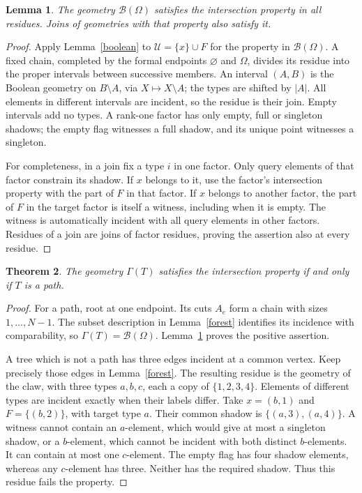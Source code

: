 \documentclass[11pt,a4paper]{article}
\newtheorem{theorem}{Theorem}
\newtheorem{lemma}[theorem]{Lemma}
\begin{document}
\begin{lemma}\label{boolean-residues}
The geometry $\mathcal B(\Omega)$ satisfies the intersection property
in all residues. Joins of geometries with that property also satisfy it.
\end{lemma}
\begin{proof}
Apply Lemma~\ref{boolean} to $\mathcal U=\{x\}\cup F$ for the property
in $\mathcal B(\Omega)$. A fixed chain, completed by the formal endpoints
$\varnothing$ and $\Omega$, divides its residue into the proper intervals
between successive members. An interval $(A,B)$ is the Boolean geometry
on $B\setminus A$, via $X\mapsto X\setminus A$; the types are shifted
by $|A|$. All elements in different intervals are incident, so the residue
is their join. Empty intervals add no types. A rank-one factor has only
empty, full or singleton shadows; the empty flag witnesses a full
shadow, and its unique point witnesses a singleton.

For completeness, in a join fix a type $i$ in one factor. Only query
elements of that factor constrain its shadow. If $x$ belongs to it, use
the factor's intersection property with the part of $F$ in that factor.
If $x$ belongs to another factor, the part of $F$ in the target factor
is itself a witness, including when it is empty. The witness is
automatically incident with all query elements in other factors.
Residues of a join are joins of factor residues, proving the assertion
also at every residue.
\end{proof}

\begin{theorem}\label{path}
The geometry $\Gamma(T)$ satisfies the intersection property if and only
if $T$ is a path.
\end{theorem}
\begin{proof}
For a path, root at one endpoint. Its cuts $A_e$ form a chain with sizes
$1,\ldots,N-1$. The subset description in Lemma~\ref{forest} identifies
its incidence with comparability, so $\Gamma(T)=\mathcal B(\Omega)$.
Lemma~\ref{boolean-residues} proves the positive assertion.

A tree which is not a path has three edges incident at a common vertex.
Keep precisely those edges in Lemma~\ref{forest}. The resulting residue
is the geometry of the claw, with three types $a,b,c$, each a copy of
$\{1,2,3,4\}$. Elements of different types are incident exactly when
their labels differ. Take $x=(b,1)$ and $F=\{(b,2)\}$, with target
type $a$. Their common shadow is $\{(a,3),(a,4)\}$. A witness cannot
contain an $a$-element, which would give at most a singleton shadow,
or a $b$-element, which cannot be incident with both distinct
$b$-elements. It can contain at most one $c$-element. The empty flag
has four shadow elements, whereas any $c$-element has three. Neither
has the required shadow. Thus this residue fails the property.
\end{proof}
\end{document}
